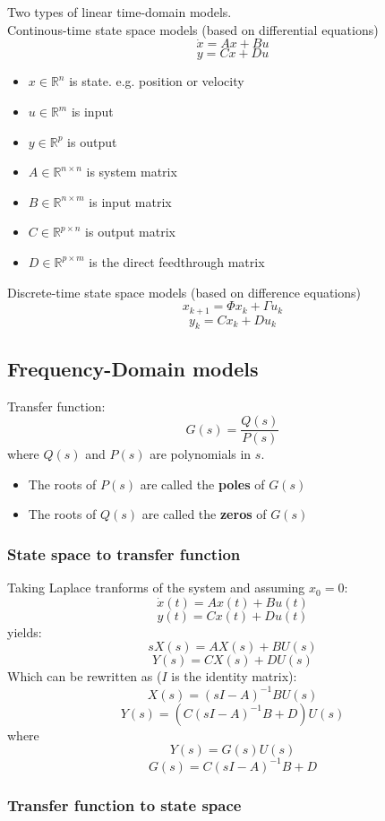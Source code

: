 Two types of linear time-domain models. \\
Continous-time state space models
(based on differential equations)
$$\dot{x} = Ax+Bu$$
$$y=Cx+Du$$
\begin{itemize}
	\item $x\in \mathbb{R}^n$ is state. e.g. position or velocity
	\item $u\in \mathbb{R}^m$ is input
	\item $y\in \mathbb{R}^p$ is output
	\item $A\in \mathbb{R}^{n\times n}$ is system matrix
	\item $B\in \mathbb{R}^{n\times m}$ is input matrix
	\item $C\in \mathbb{R}^{p\times n}$ is output matrix
	\item $D\in \mathbb{R}^{p\times m}$ is the direct feedthrough matrix
\end{itemize}
Discrete-time state space models (based on difference equations)
$$x_{k+1} = \Phi x_k + \Gamma u_k$$
$$y_k = Cx_k + Du_k$$

\subsection{Frequency-Domain models}
Transfer function:
$$G(s)=\frac{Q(s)}{P(s)}$$
where $Q(s)$ and $P(s)$ are polynomials in $s$.
\begin{itemize}
	\item The roots of $P(s)$ are called the \textbf{poles} of $G(s)$
	\item The roots of $Q(s)$ are called the \textbf{zeros} of $G(s)$
\end{itemize}
\subsubsection{State space to transfer function}
Taking Laplace tranforms of the system and assuming $x_0=0$:
$$\dot{x}(t)=Ax(t)+Bu(t)$$
$$y(t)=Cx(t)+Du(t)$$
yields:
$$sX(s)=AX(s)+BU(s)$$
$$Y(s)=CX(s)+DU(s)$$
Which can be rewritten as ($I$ is the identity matrix):
$$X(s)=\left(sI-A\right)^{-1}BU(s)$$
$$Y(s)=\left(C\left(sI-A\right)^{-1}B+D\right)U(s)$$
where
$$Y(s)=G(s)U(s)$$
$$G(s)=C\left(sI-A\right)^{-1}B+D$$
\subsubsection{Transfer function to state space}

